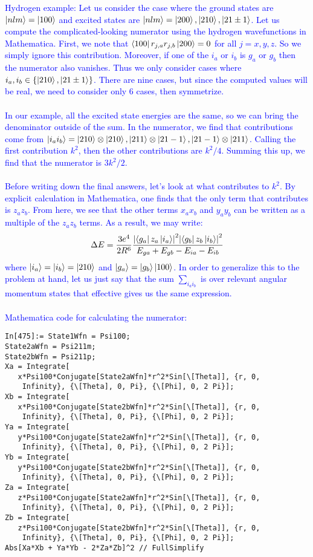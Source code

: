 \documentclass{article}
\theoremstyle{definition}
\newcommand{\f}[2]{\frac{#1}{#2}}
\begin{document}
\begin{enumerate}[label=(\alph*)]
\textcolor{blue}{Hydrogen example: Let us consider the case where the ground states are $\ket{nlm} = \ket{100}$ and excited states are $\ket{nlm} = \ket{200}, \ket{210}, \ket{21\pm1}$. Let us compute the complicated-looking numerator using the hydrogen wavefunctions in Mathematica.  First, we note that $\bra{100} r_{j,a} r_{j,b} \ket{200} = 0$ for all $j=x,y,z$. So we simply ignore this contribution. Moreover, if one of the $i_a$ or $i_b$ is $g_a$ or $g_b$ then the numerator also vanishes. Thus we only consider cases where $i_a, i_b \in \{ \ket{210}, \ket{21\pm 1} \}$. There are nine cases, but since the computed values will be real, we need to consider only 6 cases, then symmetrize. \\
\,\,\\ 
\noindent In our example, all the excited state energies are the same, so we can bring the denominator outside of the sum. In the numerator, we find that contributions come from $\ket{i_a i_b} = \ket{210}\otimes\ket{210}, \ket{211}\otimes\ket{21-1}, \ket{21-1}\otimes \ket{211}$. Calling the first contribution $k^2$, then the other contributions are $k^2/4$. Summing this up, we find that the numerator is $3k^2 /2$. \\
\,\,\\
\noindent Before writing down the final answers, let's look at what contributes to $k^2$. By explicit calculation in Mathematica, one finds that the only term that contributes is $z_a z_b$. From here, we see that the other terms $x_a x_b$ and $y_a y_b$ can be written as a multiple of the $z_a z_b$ terms. As a result, we may write:
\begin{align*}
\Delta E = \f{3e^4}{2R^6} \f{ 
\abs{\bra{g_a} z_a \ket{i_a}}^2 
\abs{ \bra{g_b} z_b \ket{i_b} }^2
}{E_{ga} + E_{gb} - E_{ia} - E_{ib}}
\end{align*}
where $\ket{i_a} = \ket{i_b} = \ket{210}$ and $\ket{g_a} = \ket{g_b} \ket{100}$.  In order to generalize this to the problem at hand, let us just say that the sum $\sum_{i_ai_b}$ is over relevant angular momentum states that effective gives us the same expression. \\
\,\,\\
\noindent Mathematica code for calculating the numerator:}
\begin{lstlisting}
In[475]:= State1Wfn = Psi100;
State2aWfn = Psi211m;
State2bWfn = Psi211p;
Xa = Integrate[
   x*Psi100*Conjugate[State2aWfn]*r^2*Sin[\[Theta]], {r, 0, 
    Infinity}, {\[Theta], 0, Pi}, {\[Phi], 0, 2 Pi}];
Xb = Integrate[
   x*Psi100*Conjugate[State2bWfn]*r^2*Sin[\[Theta]], {r, 0, 
    Infinity}, {\[Theta], 0, Pi}, {\[Phi], 0, 2 Pi}];
Ya = Integrate[
   y*Psi100*Conjugate[State2aWfn]*r^2*Sin[\[Theta]], {r, 0, 
    Infinity}, {\[Theta], 0, Pi}, {\[Phi], 0, 2 Pi}];
Yb = Integrate[
   y*Psi100*Conjugate[State2bWfn]*r^2*Sin[\[Theta]], {r, 0, 
    Infinity}, {\[Theta], 0, Pi}, {\[Phi], 0, 2 Pi}];
Za = Integrate[
   z*Psi100*Conjugate[State2aWfn]*r^2*Sin[\[Theta]], {r, 0, 
    Infinity}, {\[Theta], 0, Pi}, {\[Phi], 0, 2 Pi}];
Zb = Integrate[
   z*Psi100*Conjugate[State2bWfn]*r^2*Sin[\[Theta]], {r, 0, 
    Infinity}, {\[Theta], 0, Pi}, {\[Phi], 0, 2 Pi}];
Abs[Xa*Xb + Ya*Yb - 2*Za*Zb]^2 // FullSimplify
\end{lstlisting}


\end{enumerate}
\end{document}
